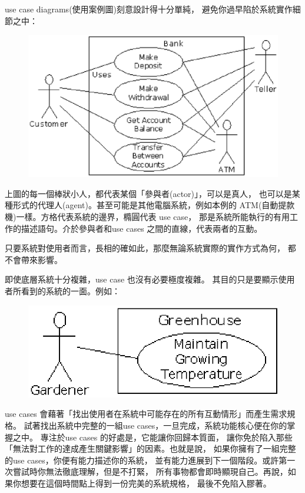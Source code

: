 use case diagrams(使用案例圖)刻意設計得十分單純，
避免你過早陷於系統實作細節之中：

\begin{figure}[htbp]
\centering
\includegraphics[scale=0.8]{eps/TIJ212.eps}
\end{figure}

上圖的每一個棒狀小人，都代表某個「參與者(actor)」，可以是真人，
也可以是某種形式的代理人(agent)。甚至可能是其他電腦系統，例如本例的
ATM(自動提款機)一樣。方格代表系統的邊界，橢圓代表 use case，
那是系統所能執行的有用工作的描述語句。介於參與者和use cases
之間的直線，代表兩者的互動。

只要系統對使用者而言，長相的確如此，那麼無論系統實際的實作方式為何，
都不會帶來影響。

即使底層系統十分複雜，use case 也沒有必要極度複雜。
其目的只是要顯示使用者所看到的系統的一面。例如：

\begin{figure}[htbp]
\centering
\includegraphics[scale=0.8]{eps/TIJ213.eps}
\end{figure}

use cases 會藉著「找出使用者在系統中可能存在的所有互動情形」而產生需求規格。
試著找出系統中完整的一組use cases，一旦完成，系統功能核心便在你的掌握之中。
專注於use cases 的好處是，它能讓你回歸本質面，
讓你免於陷入那些「無法對工作的達成產生關鍵影響」的因素。也就是說，
如果你擁有了一組完整的use cases，你便有能力描述你的系統，
並有能力進展到下一個階段。或許第一次嘗試時你無法徹底理解，但是不打緊，
所有事物都會即時顯現自己。再說，如果你想要在這個時間點上得到一份完美的系統規格，
最後不免陷入膠著。

